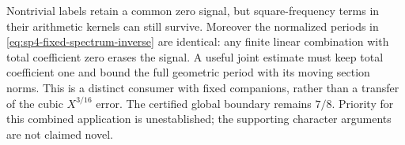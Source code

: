 Nontrivial labels retain a common zero signal, but square-frequency
terms in their arithmetic kernels can still survive. Moreover the
normalized periods in \eqref{eq:sp4-fixed-spectrum-inverse} are
identical: any finite linear combination with total coefficient zero
erases the signal. A useful joint estimate must keep total coefficient
one and bound the full geometric period with its moving section norms.
This is a distinct consumer with fixed companions, rather than a
transfer of the cubic \(X^{3/16}\) error. The certified global
boundary remains \(7/8\). Priority for this combined application is
unestablished; the supporting character arguments are not claimed novel.
